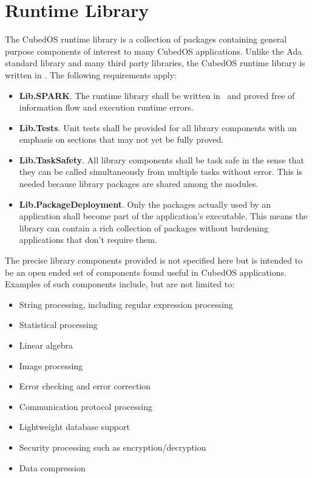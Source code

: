 \section{Runtime Library}
\label{sec:runtime-library}

The CubedOS runtime library is a collection of packages containing general purpose components of
interest to many CubedOS applications. Unlike the Ada standard library and many third party
libraries, the CubedOS runtime library is written in \SPARK. The following requirements apply:

\begin{itemize}
\item \textbf{Lib.SPARK}. The runtime library shall be written in \SPARK\ and proved free of
  information flow and execution runtime errors.
\item \textbf{Lib.Tests}. Unit tests shall be provided for all library components with an
  emphasis on sections that may not yet be fully proved.
\item \textbf{Lib.TaskSafety}. All library components shall be task safe in the sense that they
  can be called simultaneously from multiple tasks without error. This is needed because library
  packages are shared among the modules.
\item \textbf{Lib.PackageDeployment}. Only the packages actually used by an application shall
  become part of the application's executable. This means the library can contain a rich
  collection of packages without burdening applications that don't require them.
\end{itemize}

The precise library components provided is not specified here but is intended to be an open
ended set of components found useful in CubedOS applications. Examples of such components
include, but are not limited to:

\begin{itemize}
\item String processing, including regular expression processing
\item Statistical processing
\item Linear algebra
\item Image processing
\item Error checking and error correction
\item Communication protocol processing
\item Lightweight database support
\item Security processing such as encryption/decryption
\item Data compression
\end{itemize}

